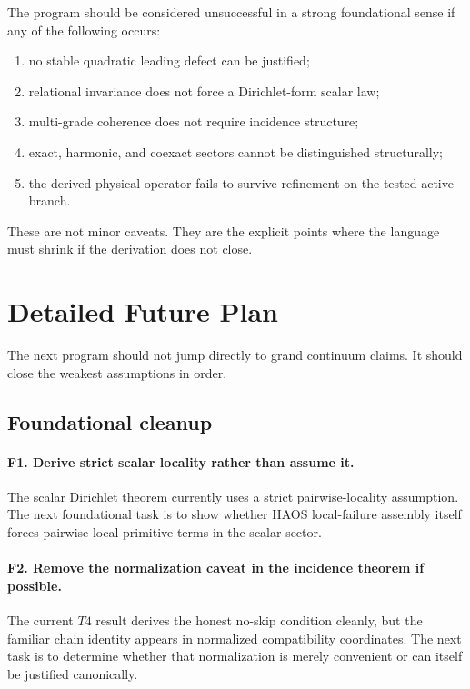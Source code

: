 \documentclass[11pt]{article}
\begin{document}
The program should be considered unsuccessful in a strong foundational sense if any of the following occurs:
\begin{enumerate}
\item no stable quadratic leading defect can be justified;
\item relational invariance does not force a Dirichlet-form scalar law;
\item multi-grade coherence does not require incidence structure;
\item exact, harmonic, and coexact sectors cannot be distinguished structurally;
\item the derived physical operator fails to survive refinement on the tested active branch.
\end{enumerate}

These are not minor caveats. They are the explicit points where the language must shrink if the derivation does not close.

\section{Detailed Future Plan}

The next program should not jump directly to grand continuum claims. It should close the weakest assumptions in order.

\subsection{Foundational cleanup}

\paragraph{F1. Derive strict scalar locality rather than assume it.}
The scalar Dirichlet theorem currently uses a strict pairwise-locality assumption. The next foundational task is to show whether HAOS local-failure assembly itself forces pairwise local primitive terms in the scalar sector.

\paragraph{F2. Remove the normalization caveat in the incidence theorem if possible.}
The current $T4$ result derives the honest no-skip condition cleanly, but the familiar chain identity appears in normalized compatibility coordinates. The next task is to determine whether that normalization is merely convenient or can itself be justified canonically.
\end{document}
